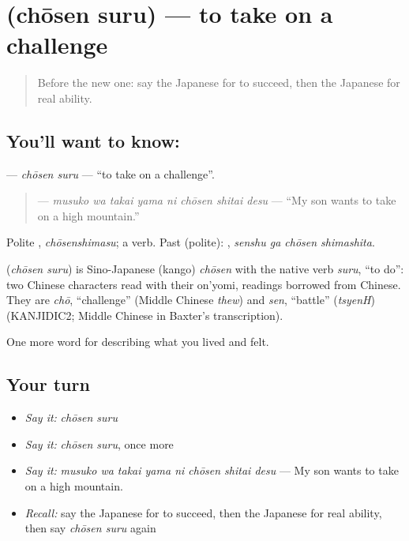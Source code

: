 \section[\texorpdfstring{\ja{ちょうせんする} (chōsen suru)}{ちょうせんする (chōsen suru)}]{ (chōsen suru) — to take on a challenge}

\label{lesson:JA-C460-chousen-suru}



\begin{quote}
Before the new one: say the Japanese for to succeed, then the Japanese for real ability.
\end{quote}

\subsection*{You'll want to know: }
\textbf{} — \emph{chōsen suru} — \textquotedblleft{}to take on a challenge\textquotedblright{}.

\begin{quote}
\textbf{   } — \emph{musuko wa takai yama ni chōsen shitai desu} — \textquotedblleft{}My son wants to take on a high mountain.\textquotedblright{}
\end{quote}

Polite \textbf{}, \emph{chōsenshimasu}; a  verb. Past (polite): \textbf{ }, \emph{senshu ga chōsen shimashita}.

\begin{cousinweb}
\textbf{} (\emph{chōsen suru}) is Sino-Japanese (kango) \emph{chōsen} with the native verb \emph{suru}, \textquotedblleft{}to do\textquotedblright{}: two Chinese characters read with their on'yomi, readings borrowed from Chinese. They are \emph{chō}, \textquotedblleft{}challenge\textquotedblright{} (Middle Chinese \emph{thew}) and \emph{sen}, \textquotedblleft{}battle\textquotedblright{} (\emph{tsyenH}) (KANJIDIC2; Middle Chinese in Baxter's transcription).
\end{cousinweb}

\begin{grammarlens}[title={What you've built}]
One more word for describing what you lived and felt.
\end{grammarlens}

\subsection*{Your turn}
\begin{itemize}
\raggedright
  \item \emph{Say it:} \emph{chōsen suru}
  \item \emph{Say it:} \emph{chōsen suru}, once more
  \item \emph{Say it:} \emph{musuko wa takai yama ni chōsen shitai desu} — My son wants to take on a high mountain.
  \item \emph{Recall:} say the Japanese for to succeed, then the Japanese for real ability, then say \emph{chōsen suru} again
\end{itemize}

